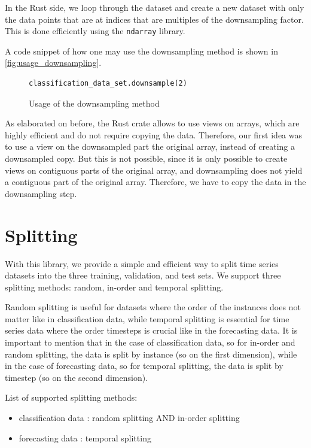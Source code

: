 \documentclass[review]{AIM_report}
\begin{document}
In the Rust side, we loop through the dataset and create a new dataset with only the data points that are at indices that are multiples of the downsampling factor. This is done efficiently using the \texttt{ndarray} library.

A code snippet of how one may use the downsampling method is shown in \autoref{fig:usage_downsampling}.
\begin{figure}[H]
    \begin{lstlisting}[style=python]
classification_data_set.downsample(2)
    \end{lstlisting}
    \caption{Usage of the downsampling method}
    \label{fig:usage_downsampling}
\end{figure}

As elaborated on before, the Rust \numpy crate allows to use views on arrays, which are highly efficient and do not require copying the data. Therefore, our first idea was to use a view on the downsampled part the original array, instead of creating a downsampled copy. But this is not possible, since it is only possible to create views on contiguous parts of the original array, and downsampling does not yield a contiguous part of the original array. Therefore, we have to copy the data in the downsampling step.

\newpage
\section{Splitting}
\label{sec:splitting}

With this library, we provide a simple and efficient way to split time series datasets into the three training, validation, and test sets. We support three splitting methods: random, in-order and temporal splitting.

Random splitting is useful for datasets where the order of the instances does not matter like in classification data, while temporal splitting is essential for time series data where the order timesteps is crucial like in the forecasting data. It is important to mention that in the case of classification data, so for in-order and random splitting, the data is split by instance (so on the first dimension), while in the case of forecasting data, so for temporal splitting, the data is split by timestep (so on the second dimension).

List of supported splitting methods:
\begin{itemize}
    \item classification data : random splitting AND in-order splitting
    \item forecasting data : temporal splitting
\end{itemize}
\end{document}
